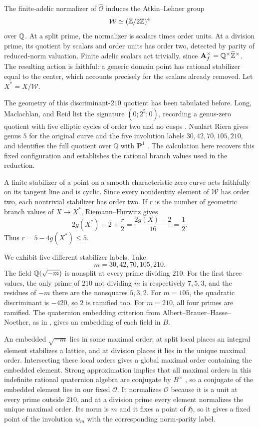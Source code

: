 The finite-adelic normalizer of $\widehat{\mathcal O}$ induces the
Atkin--Lehner group
\[
                  \mathcal W\simeq(\mathbb Z/2\mathbb Z)^4
\]
over $\mathbb Q$.  At a split prime, the normalizer is scalars times order
units.  At a division prime, its quotient by scalars and order units
has order two, detected by parity of reduced-norm valuation.  Finite
adelic scalars act trivially, since
$\mathbf A_f^\times=\mathbb Q^\times\widehat{\mathbb Z}^\times$.  The resulting
action is faithful: a generic domain point has rational stabilizer
equal to the center, which accounts precisely for the scalars already
removed.  Let $X^*=X/\mathcal W$.

The geometry of this discriminant-\(210\) quotient has been tabulated
before.  Long, Maclachlan, and Reid list the signature
\((0;2^5;0)\), recording a genus-zero quotient with five elliptic
cycles of order two and no cusps
\cite[Table~3]{LongMaclachlanReid2006}.  Nualart Riera gives genus
\(5\) for the original curve and the five involution labels
\(30,42,70,105,210\), and identifies the full quotient over
\(\mathbb Q\) with \(\mathbf P^1\)
\cite[Propositions~4.1--4.2]{Nualart2015}.  The calculation here
recovers this fixed configuration and establishes the rational branch
values used in the reduction.

A finite stabilizer of a point on a smooth characteristic-zero curve
acts faithfully on its tangent line and is cyclic.  Since every
nonidentity element of $\mathcal W$ has order two, each nontrivial
stabilizer has order two.  If $r$ is the number of geometric branch
values of $X\to X^*$, Riemann--Hurwitz gives
\begin{equation}\label{hei:hurwitz}
             2g(X^*)-2+\frac r2=\frac{2g(X)-2}{16}=\frac12.
\end{equation}
Thus $r=5-4g(X^*)\le5$.

We exhibit five different stabilizer labels.  Take
\[
                         m=30,42,70,105,210.
\]
The field $\mathbb Q(\sqrt{-m})$ is nonsplit at every prime dividing $210$.
For the first three values, the only prime of $210$ not dividing $m$
is respectively $7,5,3$, and the residues of $-m$ there are the
nonsquares $5,3,2$.  For $m=105$, the quadratic discriminant is
$-420$, so $2$ is ramified too.  For $m=210$, all four primes are
ramified.  The quaternion embedding criterion from
Albert--Brauer--Hasse--Noether, as in \cite{Voight2021}, gives an
embedding of each field in $B$.

An embedded $\sqrt{-m}$ lies in some maximal order: at split local
places an integral element stabilizes a lattice, and at division
places it lies in the unique maximal order.  Intersecting these local
orders gives a global maximal order containing the embedded element.
Strong approximation implies that all maximal orders in this
indefinite rational quaternion algebra are conjugate by $B^\times$
\cite[Theorems 28.2.10 and 28.2.11(b)]{Voight2021}, so a conjugate
of the embedded element lies in our fixed $\mathcal O$.
It normalizes $\mathcal O$ because it is a unit at every prime outside
$210$, and at a division prime every element normalizes the unique
maximal order.  Its norm is $m$ and it fixes a point of $\mathfrak H$,
so it gives a fixed point of the involution $w_m$ with the corresponding
norm-parity label.

